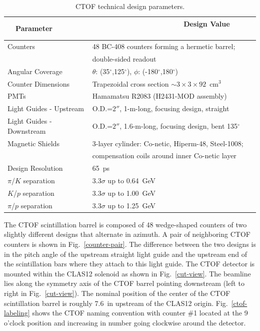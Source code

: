 \documentclass[12pt]{article}
\begin{document}
\begin{table}[htbp]
\begin{center}
\begin{tabular} {|l|l|} \hline
~~Parameter~~ &~~~~~~~~~~~~~~~~~~~~~~ Design Value ~~~~~~~~~~\\ \hline \hline
Counters                  & 48 BC-408 counters forming a hermetic barrel; \\
                          & double-sided readout                   \\ \hline
Angular Coverage          & $\theta$: (35$^\circ$,125$^\circ$), $\phi$: 
(-180$^\circ$,180$^\circ$) \\ \hline
Counter Dimensions        & Trapezoidal cross section $\sim 3 \times 3 \times 
92$~cm$^3$ \\ \hline
PMTs                      & Hamamatsu R2083 (H2431-MOD assembly)    \\ \hline
Light Guides - Upstream   & O.D.=$2''$, 1-m-long, focusing design, straight \\ \hline
Light Guides - Downstream & O.D.=$2''$, 1.6-m-long, focusing design, bent 135$^\circ$ \\ 
\hline
Magnetic Shields          & 3-layer cylinder: Co-netic, Hiperm-48, Steel-1008; \\ 
                          & compensation coils around inner Co-netic layer \\ \hline
Design Resolution         & 65~ps \\ \hline
$\pi$/$K$ separation      & 3.3$\sigma$ up to 0.64~GeV \\ \hline
$K$/$p$ separation        & 3.3$\sigma$ up to 1.00~GeV \\ \hline
$\pi$/$p$ separation      & 3.3$\sigma$ up to 1.25~GeV \\ \hline
\end{tabular}
\end{center}
\caption{CTOF technical design parameters.}
\label{details}
\end{table}

The CTOF scintillation barrel is composed of 48 wedge-shaped counters of two 
slightly different designs that alternate in azimuth. A pair of neighboring CTOF 
counters is shown in Fig.~\ref{counter-pair}. The difference between the two 
designs is in the pitch angle of the upstream straight light guide and the upstream 
end of the scintillation bars where they attach to this light guide. The CTOF 
detector is mounted within the CLAS12 solenoid as shown in Fig.~\ref{cut-view}. The 
beamline lies along the symmetry axis of the CTOF barrel pointing downstream (left 
to right in Fig.~\ref{cut-view}). The nominal position of the center of the CTOF
scintillation barrel is roughly 7.6~in upstream of the CLAS12 origin. 
Fig.~\ref{ctof-labeling} shows the CTOF naming convention with counter \#1 located 
at the 9 o'clock position and increasing in number going clockwise around the 
detector.
\end{document}
